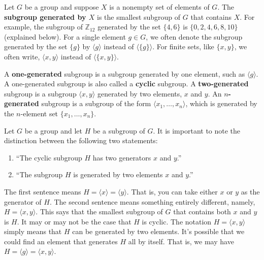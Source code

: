 \documentclass[12pt]{article}
\newcommand{\Z} {{\mathbb Z}}
\newcommand{\<}{\ensuremath{\langle}}
\renewcommand{\>}{\ensuremath{\rangle}}
\theoremstyle{plain}
\theoremstyle{definition}
\begin{document}
Let $G$ be a group and suppose $X$ is a nonempty set of elements of $G$.
The {\bf subgroup generated by $X$} is the smallest subgroup of $G$ that
contains $X$.  
For example, the subgroup of $\Z_{12}$ generated by the set $\{4, 6\}$ is 
$\{0, 2, 4, 6, 8, 10\}$ (explained below).
For a single element $g \in G$, we often denote the subgroup generated
by the set $\{g\}$ by $\<g\>$ instead of $\<\{g\}\>$.  
For finite sets, like $\{x, y\}$, we often write, 
$\<x, y\>$ instead of $\<\{x, y\}\>$.

A {\bf one-generated} subgroup is a subgroup generated by one
element, such as $\<g\>$.  A one-generated subgroup is also called a 
{\bf cyclic} subgroup.  A {\bf two-generated} subgroup is a
subgroup $\<x, y\>$ generated by two elements, $x$ and $y$.
An {\bf $n$-generated} subgroup is a
subgroup of the form $\<x_1, \dots, x_n\>$, which is generated by the
$n$-element set $\{x_1, \dots, x_n\}$.

Let $G$ be a group and let $H$ be a subgroup of $G$.
It is important to note the distinction between the following two statements:
\begin{enumerate}
\item ``The cyclic subgroup $H$ has two generators $x$ and $y$.''
\item ``The subgroup $H$ is generated by two elements $x$ and $y$.''
\end{enumerate}
The first sentence means $H = \<x\> = \<y\>$.  That is, you can take either $x$
or $y$ as the generator of $H$.  
The second sentence means something entirely different, namely, $H = \<x, y\>$.
This says that the smallest subgroup of $G$ that contains both $x$ and $y$ is
$H$.  It may or may not be the case that $H$ is cyclic.  The
notation $H = \<x, y\>$ simply means that $H$ can be generated by two elements.
It's possible that we could find an element that generates $H$ all by itself.
That is, we may have $H = \<g\> = \<x, y\>$.

\bigskip
\end{document}

